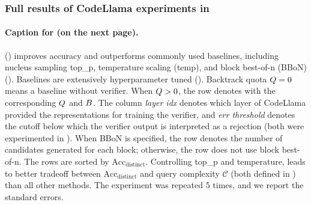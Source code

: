 




\clearpage
\subsubsection{Full results of CodeLlama experiments in }
\label{sec:experiments:codellama:full_results}

\paragraph{Caption for  (on the next page).}
\algoName () improves accuracy
and outperforms commonly used baselines, including
nucleus sampling top\_p,
temperature scaling (temp),
and block best-of-n (BBoN) ().
Baselines are extensively hyperparameter tuned ().
Backtrack quota $Q = 0$ means a baseline without verifier.
When $Q > 0$,
the row denotes  
with the corresponding $Q$ and $B$.
The column \emph{layer idx} denotes which layer of CodeLlama provided the representations for training the verifier,
and \emph{err threshold} denotes the cutoff below which the verifier output is interpreted as a rejection
(both were experimented in ).
When BBoN is specified,
the row denotes the number of candidates generated for each block;
otherwise, the row does not use block best-of-n.
The rows are sorted by $\text{Acc}_\text{distinct}$.
Controlling top\_p and temperature, 
leads to better tradeoff between $\text{Acc}_\text{distinct}$ 
and query complexity $\mathcal{C}$
(both defined in )
than all other methods.
The experiment was repeated 5 times,
and we report the standard errors.


